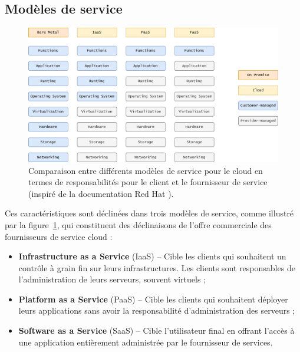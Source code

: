 \subsection{Modèles de service}

\begin{figure}[htbp]
    \centering
	\includegraphics[width=\textwidth]{2_Chapitre2/figures/service-models.png}
	\caption[Comparaison entre différents modèles de service pour le cloud en termes de responsabilités pour le client et le fournisseur de service.]{Comparaison entre différents modèles de service pour le cloud en termes de responsabilités pour le client et le fournisseur de service (inspiré de la documentation Red Hat \protect \footnotemark).}
	\label{fig:service-model}
\end{figure}


Ces caractéristiques sont déclinées dans trois modèles de service, comme illustré par la figure~\ref{fig:service-model}, qui constituent des déclinaisons de l'offre commerciale des fournisseurs de service cloud :

\begin{itemize}
    \item \textbf{Infrastructure as a Service} (\gls{IaaS}) -- Cible les clients qui souhaitent un contrôle à grain fin sur leurs infrastructures. Les clients sont responsables de l'administration de leurs serveurs, souvent virtuels ;
    \item \textbf{Platform as a Service} (\gls{PaaS}) -- Cible les clients qui souhaitent déployer leurs applications sans avoir la responsabilité d'administration des serveurs ;
    \item \textbf{Software as a Service} (\gls{SaaS}) -- Cible l'utilisateur final en offrant l'accès à une application entièrement administrée par le fournisseur de services.
\end{itemize}

